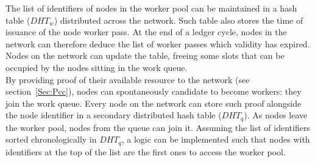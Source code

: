 The list of identifiers of nodes in the worker pool can be maintained in a hash table ($DHT_w$) distributed across the network. Such table also stores the time of issuance of the node worker pass. At the end of a ledger cycle, nodes in the network can therefore deduce the list of worker passes which validity has expired. Nodes on the network can update the table, freeing some slots that can be occupied by the nodes sitting in the work queue. \\
By providing proof of their available resource to the network (see section~\ref{Sec:Pcc}), nodes can spontaneously candidate to become workers: they join the work queue. Every node on the network can store such proof alongside the node identifier in a secondary distributed hash table ($DHT_q$). As nodes leave the worker pool, nodes from the queue can join it. Assuming the list of identifiers sorted chronologically in $DHT_q$, a logic can be implemented such that nodes with identifiers at the top of the list are the first ones to access the worker pool. \\

